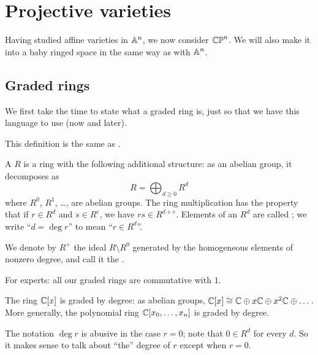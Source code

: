\chapter{Projective varieties}
Having studied affine varieties in $\mathbb A^n$, we now consider $\mathbb{CP}^n$.
We will also make it into a baby ringed space
in the same way as with $\mathbb A^n$.

\section{Graded rings}
We first take the time to state what a graded ring is,
just so that we have this language to use (now and later).

This definition is the same as .

\begin{definition}
	A  $R$ is a ring with the following additional structure:
	as an abelian group, it decomposes as
	\[ R = \bigoplus_{d \ge 0} R^d \]
	where $R^0$, $R^1$, \dots, are abelian groups.
	The ring multiplication has the property that
	if $r \in R^d$ and $s \in R^e$, we have $rs \in R^{d+e}$.
	Elements of an $R^d$ are called ;
	we write ``$d = \deg r$'' to mean ``$r \in R^d$''.

	We denote by $R^+$ the ideal $R \setminus R^0$ generated by
	the homogeneous elements of nonzero degree,
	and call it the .
\end{definition}
\begin{remark}
	For experts: all our graded rings are commutative with $1$.
\end{remark}
\begin{example}
	\listhack
	\begin{enumerate}[(a)]
		\ii The ring $\mathbb C[x]$ is graded by degree: as abelian groups,
		$\mathbb C[x] \cong \mathbb C \oplus x\mathbb C \oplus x^2\mathbb C \oplus \dots$.
		\ii More generally, the polynomial ring $\mathbb C[x_0, \dots, x_n]$
		is graded by degree.
	\end{enumerate}
\end{example}
\begin{abuse}
	The notation $\deg r$ is abusive in the case $r = 0$;
	note that $0 \in R^d$ for every $d$.
	So it makes sense to talk about ``the'' degree of $r$
	except when $r = 0$.
\end{abuse}

